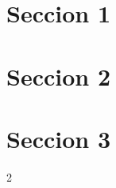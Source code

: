 \documentclass{formulario}
\begin{document}

\begin{multicols*}{2}
    \section{Seccion 1}
    \section{Seccion 2}

    \section{Seccion 3}
\end{multicols*}{2}
\end{document}

